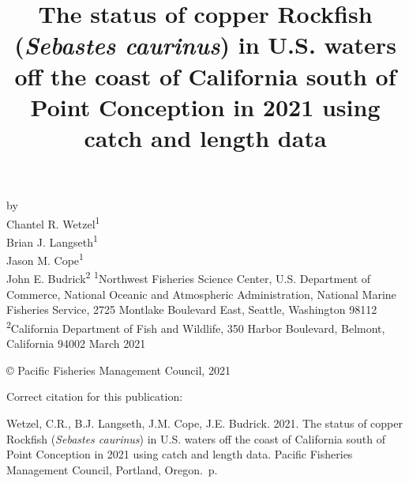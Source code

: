 \documentclass[11pt,
  english,
  a4paper,
]{article}
\date{}
\newcommand{\trTitle}{The status of copper Rockfish (\emph{Sebastes caurinus}) in U.S. waters off the coast of California south of Point Conception in 2021 using catch and length data}
\newcommand{\trYear}{2021}
\newcommand{\trMonth}{March}
\newcommand{\trAuthsBack}{Wetzel, C.R., B.J. Langseth, J.M. Cope, J.E. Budrick}
\newcommand{\trCitation}{
\begin{hangparas}{1em}{1}
\trAuthsBack{}. \trYear{}. \trTitle{}. Pacific Fisheries Management Council, Portland, Oregon. \pageref{LastPage}{}\,p.
\end{hangparas}}
\begin{document}

\renewcommand*{\thefootnote}{\fnsymbol{footnote}}

\small
\thispagestyle{empty}
\noindent
\begin{center}
\title{The status of copper Rockfish (\emph{Sebastes caurinus}) in U.S. waters off the coast of California south of Point Conception in 2021 using catch and length data}
\vspace{1.5cm}
{\Large\textbf{}}
\vfill
by\\
Chantel R. Wetzel\textsuperscript{1}\\
Brian J. Langseth\textsuperscript{1}\\
Jason M. Cope\textsuperscript{1}\\
John E. Budrick\textsuperscript{2}\vfill
\textsuperscript{1}Northwest Fisheries Science Center, U.S. Department of Commerce, National Oceanic and Atmospheric Administration, National Marine Fisheries Service, 2725 Montlake Boulevard East, Seattle, Washington 98112\\
\textsuperscript{2}California Department of Fish and Wildlife, 350 Harbor Boulevard, Belmont, California 94002\vfill
\trMonth{} \trYear{}
\end{center}
\clearpage

\thispagestyle{empty}
\vspace*{\fill}
\begin{center}
\copyright{} Pacific Fisheries Management Council, \trYear{}\\
\end{center}
\par
\bigskip
\noindent
Correct citation for this publication:
\bigskip
\par
\trCitation{}
\clearpage


\tableofcontents\clearpage
\listoffigures \listoftables \clearpage
\label{TRlastRoman}
\clearpage

\newpage
\thispagestyle{empty} %
\end{document}
